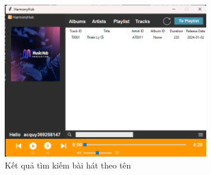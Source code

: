 \documentclass[a4paper]{article}
\begin{document}
\begin{figure}
	\centering
	\includegraphics[width=0.8\textwidth]{images/UIaftersearching.png}
	\caption{Kết quả tìm kiếm bài hát theo tên}
\end{figure}
\end{document}
